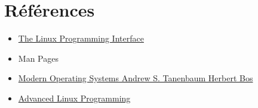 \section{Références}

\begin{itemize}
    \item \href{https://github.com/lancetw/ebook-1/blob/master/01_programming/The%20Linux%20Programming%20Interface.pdf}{The Linux Programming Interface}
    \\
    \item Man Pages
    \\
    \item \href{https://csc-knu.github.io/sys-prog/books/Andrew%20S.%20Tanenbaum%20-%20Modern%20Operating%20Systems.pdf}{Modern Operating Systems Andrew S. Tanenbaum Herbert Bos}
    \\
    \item \href{ https://mentorembedded.github.io/advancedlinuxprogramming/alp-folder/advanced-linux-programming.pdf}{Advanced Linux Programming}
\end{itemize}